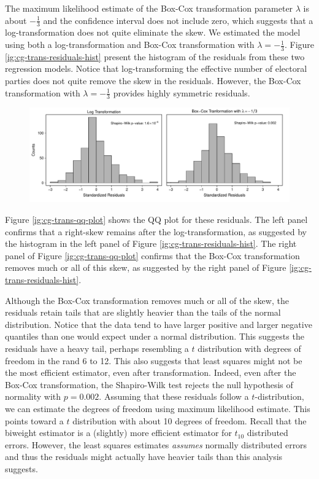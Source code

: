 \documentclass[10pt]{article}
\begin{document}
The maximum likelihood estimate of the Box-Cox transformation parameter $\lambda$ is about $-\frac{1}{3}$ and the confidence interval does not include zero, which suggests that a log-transformation does not quite eliminate the skew. We estimated the model using both a log-transformation and Box-Cox transformation with $\lambda = -\frac{1}{3}$. Figure \ref{ig:cg-trans-residuals-hist} present the histogram of the residuals from these two regression models. Notice that log-transforming the effective number of electoral parties does not quite remove the skew in the residuals. However, the Box-Cox transformation with $\lambda = -\frac{1}{3}$ provides highly symmetric residuals. 

\begin{figure}[h!]
\begin{center}
\includegraphics[width = \textwidth]{figs/cg-trans-residuals-hist.pdf}
\caption{}\label{fig:cg-trans-residuals-hist}
\end{center}
\end{figure}

Figure \ref{ig:cg-trans-qq-plot} shows the QQ plot for these residuals. The left panel confirms that a right-skew remains after the log-transformation, as suggested by the histogram in the left panel of Figure \ref{ig:cg-trans-residuals-hist}. The right panel of Figure \ref{ig:cg-trans-qq-plot} confirms that the Box-Cox transformation removes much or all of this skew, as suggested by the right panel of Figure \ref{ig:cg-trans-residuals-hist}. 

Although the Box-Cox transformation removes much or all of the skew, the residuals retain tails that are slightly heavier than the tails of the normal distribution. Notice that the data tend to have larger positive and larger negative quantiles than one would expect under a normal distribution. This suggests the residuals have a heavy tail, perhaps resembling a $t$ distribution with degrees of freedom in the rand 6 to 12. This also suggests that least squares might not be the most efficient estimator, even after transformation. Indeed, even after the Box-Cox transformation, the Shapiro-Wilk test rejects the null hypothesis of normality with $p = 0.002$. Assuming that these residuals follow a $t$-distribution, we can estimate the degrees of freedom using maximum likelihood estimate. This points toward a $t$ distribution with about 10 degrees of freedom. Recall that the biweight estimator is a (slightly) more efficient estimator for $t_{10}$ distributed errors. However, the least squares estimates \textit{assumes} normally distributed errors and thus the residuals might actually have heavier tails than this analysis suggests.
\end{document}
